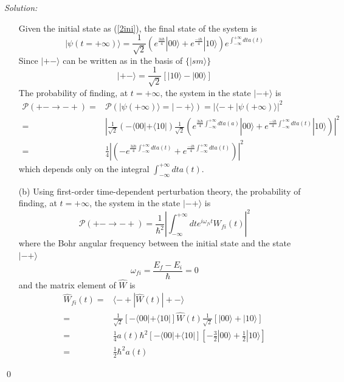 \documentclass[10pt,a4paper]{article}
\newenvironment{sol}
    {\emph{Solution:}
    }
    {
    \qed
    }
\begin{document}
\begin{sol}
\begin{itemize}
\begin{equation}
\end{equation}
Given the initial state as (\ref{2ini}), the final state of the system is
\begin{equation}
|\psi(t=+\infty)\rangle=\frac{1}{\sqrt{2}}(e^{\frac{3i\hbar}{4}}|00\rangle+e^{\frac{-i\hbar}{4}}|10\rangle)e^{\int_{-\infty}^{+\infty}dta(t)}
\end{equation}
Since $|+-\rangle$ can be written as in the basis of $\{|sm\rangle\}$
\begin{equation}
|+-\rangle=\frac{1}{\sqrt{2}}[|10\rangle-|00\rangle]
\end{equation}
The probability of finding, at $t=+\infty$, the system in the state $|-+\rangle$ is
\begin{align}
\nonumber\mathscr{P}(+-\rightarrow-+)=&\mathscr{P}(|\psi(+\infty)\rangle=|-+\rangle)=|\langle-+|\psi(+\infty)\rangle|^2\\
\nonumber=&\left|\frac{1}{\sqrt{2}}(-\langle00|+\langle10|)\frac{1}{\sqrt{2}}(e^{\frac{3i\hbar}{4}\int_{-\infty}^{+\infty}dta(a)}|00\rangle+e^{\frac{-i\hbar}{4}\int_{-\infty}^{+\infty}dta(t)}|10\rangle)\right|^2\\
=&\frac{1}{4}\left|(-e^{\frac{3i\hbar}{4}\int_{-\infty}^{+\infty}dta(t)}+e^{\frac{-i\hbar}{4}\int_{-\infty}^{+\infty}dta(t)})\right|^2
\end{align}
which depends only on the integral $\int_{-\infty}^{+\infty}dta(t)$.
\item[(b)] Using first-order time-dependent perturbation theory, the probability of finding, at $t=+\infty$, the system in the state $|-+\rangle$ is
\begin{equation}
\mathscr{P}(+-\rightarrow-+)=\frac{1}{\hbar^2}\left|\int_{-\infty}^{+\infty}dte^{i\omega_{fi}t}W_{fi}(t)\right|^2
\end{equation}
where the Bohr angular frequency between the initial state and the state $|-+\rangle$
\begin{equation}
\omega_{fi}=\frac{E_f-E_i}{\hbar}=0
\end{equation}
and the matrix element of $\hat{W}$ is
\begin{align}
\nonumber\hat{W}_{fi}(t)=&\langle-+|\hat{W}(t)|+-\rangle\\
\nonumber=&\frac{1}{\sqrt{2}}[-\langle00|+\langle10|]\hat{W}(t)\frac{1}{\sqrt{2}}[|00\rangle+|10\rangle]\\
\nonumber=&\frac{1}{4}a(t)\hbar^2[-\langle00|+\langle10|][-\frac{3}{2}|00\rangle+\frac{1}{2}|10\rangle]\\
=&\frac{1}{2}\hbar^2a(t)
\end{align}

\end{itemize}
\end{sol}
\end{document}
